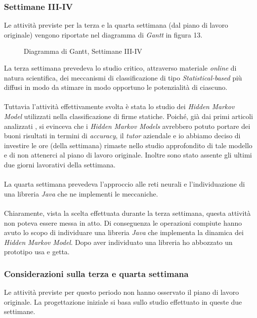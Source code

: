 \subsubsection{Settimane III-IV}
\label{3.1.2}
Le attività previste per la terza e la quarta settimana (dal piano di lavoro originale) vengono riportate nel diagramma di \emph{Gantt} in figura 13.
\begin{figure}[H]
\centering
\noindent{}
\caption{Diagramma di Gantt, Settimane III-IV}
\end{figure}
La terza settimana prevedeva lo studio critico, attraverso materiale \emph{online} di natura scientifica, dei meccanismi di classificazione di tipo \emph{Statistical-based} più diffusi in modo da stimare in modo opportuno le potenzialità di ciascuno.\\\\
Tuttavia l'attività effettivamente svolta è stata lo studio dei \emph{Hidden Markov Model} utilizzati nella classificazione di firme statiche. Poiché, già dai primi articoli analizzati \cite{3}\cite{5}\cite{6}, si evinceva che i \emph{Hidden Markov Models} avrebbero potuto portare dei buoni risultati in termini di \emph{accuracy}, il \emph{tutor} aziendale e io abbiamo deciso di investire le ore (della settimana) rimaste nello studio approfondito di tale modello e di non attenerci al piano di lavoro originale. Inoltre sono stato assente gli ultimi due giorni lavorativi della settimana.\\\\
La quarta settimana prevedeva l'approccio alle reti neurali e l'individuazione di una libreria \emph{Java} che ne implementi le meccaniche.\\\\Chiaramente, vista la scelta effettuata durante la terza settimana, questa attività non poteva essere messa in atto. Di conseguenza le operazioni compiute hanno avuto lo scopo di individuare una libreria \emph{Java} che implementa la dinamica dei \emph{Hidden Markov Model}. Dopo aver individuato una libreria ho abbozzato un prototipo usa e getta.
\subsubsection*{Considerazioni sulla terza e quarta settimana}
Le attività previste per questo periodo non hanno osservato il piano di lavoro originale. La progettazione iniziale si basa sullo studio effettuato in queste due settimane.
\label{3.1.2.1}
